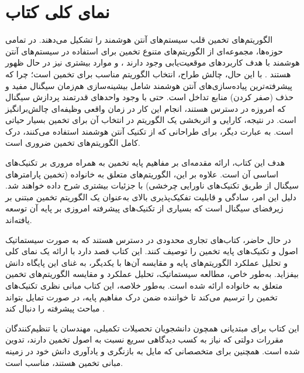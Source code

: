 \section{نمای کلی کتاب}
\label{sec:1-2}

الگوریتم‌های تخمین  قلب سیستم‌های آنتن هوشمند را تشکیل می‌دهند. در تمامی حوزه‌ها، مجموعه‌ای از الگوریتم‌های متنوع تخمین  برای استفاده در سیستم‌های آنتن هوشمند با هدف کاربردهای موقعیت‌یابی وجود دارند \cite{10}، و موارد بیشتری نیز در حال ظهور هستند \cite{3, 11}. با این حال، چالش طراح، انتخاب الگوریتم مناسب برای تخمین  است؛ چرا که پیشرفته‌ترین پیاده‌سازی‌های آنتن هوشمند شامل بیشینه‌سازی هم‌زمان سیگنال مفید و حذف (صفر کردن) منابع تداخل است. حتی با وجود واحدهای قدرتمند پردازش سیگنال که امروزه در دسترس هستند، انجام این کار در زمان واقعی وظیفه‌ای چالش‌برانگیز است. در نتیجه، کارایی و اثربخشی یک الگوریتم در انتخاب آن برای تخمین  بسیار حیاتی است. به عبارت دیگر، برای طراحانی که از تکنیک آنتن هوشمند استفاده می‌کنند، درک کامل الگوریتم‌های تخمین  ضروری است.

هدف این کتاب، ارائه مقدمه‌ای بر مفاهیم پایه تخمین  به همراه مروری بر تکنیک‌های اساسی آن است. علاوه بر این، الگوریتم‌های متعلق به خانواده  (تخمین پارامترهای سیگنال از طریق تکنیک‌های ناورایی چرخشی) با جزئیات بیشتری شرح داده خواهند شد. دلیل این امر، سادگی و قابلیت تفکیک‌پذیری بالای  به‌عنوان یک الگوریتم تخمین  مبتنی بر زیرفضای سیگنال است که بسیاری از تکنیک‌های پیشرفته امروزی بر پایه آن توسعه یافته‌اند.

در حال حاضر، کتاب‌های تجاری محدودی در دسترس هستند که به صورت سیستماتیک اصول و تکنیک‌های پایه تخمین  را توصیف کنند. این کتاب قصد دارد با ارائه یک نمای کلی و تحلیل عملکرد الگوریتم‌های پایه  و مقایسه آن‌ها با یکدیگر، به غنای این پایگاه دانش بیفزاید. به‌طور خاص، مطالعه سیستماتیک، تحلیل عملکرد و مقایسه الگوریتم‌های تخمین  متعلق به خانواده  ارائه شده است. به‌طور خلاصه، این کتاب مبانی نظری تکنیک‌های تخمین  را ترسیم می‌کند تا خواننده ضمن درک مفاهیم پایه، در صورت تمایل بتواند مباحث پیشرفته  را دنبال کند \cite{10, 11}.

این کتاب برای مبتدیانی همچون دانشجویان تحصیلات تکمیلی، مهندسان یا تنظیم‌کنندگان مقررات دولتی که نیاز به کسب دیدگاهی سریع نسبت به اصول تخمین  دارند، تدوین شده است. همچنین برای متخصصانی که مایل به بازنگری و یادآوری دانش خود در زمینه مبانی تخمین  هستند، مناسب است.

